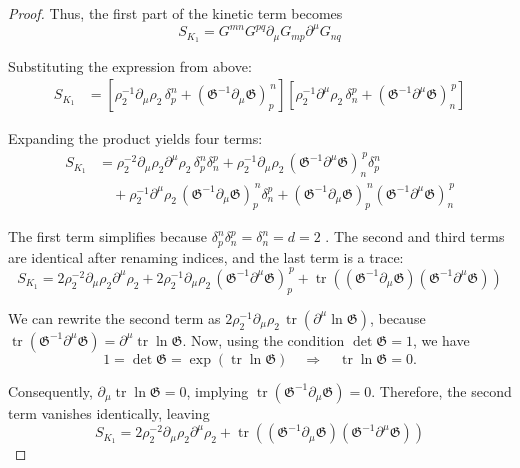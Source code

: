 \begin{tcolorbox}[breakable]
\begin{proof}
		Thus, the first part of the kinetic term becomes
		\begin{equation}
			S_{K_1} = G^{mn}G^{pq}\partial_\mu G_{mp}\partial^\mu G_{nq}
		\end{equation}
		
		Substituting the expression from above:
		\begin{align}
			S_{K_1} &= \left[ \rho_2^{-1}\partial_\mu \rho_2\,\delta_p^n + (\mathfrak{G}^{-1}\partial_\mu \mathfrak{G})_p^{\,n} \right] 
			\left[ \rho_2^{-1}\partial^\mu \rho_2\,\delta_n^p + (\mathfrak{G}^{-1}\partial^\mu \mathfrak{G})_n^{\,p} \right]
		\end{align}
		
		Expanding the product yields four terms:
		\begin{align}
			S_{K_1} &= \rho_2^{-2}\partial_\mu \rho_2\partial^\mu \rho_2\,\delta_p^n\delta_n^p  + \rho_2^{-1}\partial_\mu \rho_2\,(\mathfrak{G}^{-1}\partial^\mu \mathfrak{G})_n^{\,p}\delta_p^n \nonumber \\
			&\quad + \rho_2^{-1}\partial^\mu \rho_2\,(\mathfrak{G}^{-1}\partial_\mu \mathfrak{G})_p^{\,n}\delta_n^p + (\mathfrak{G}^{-1}\partial_\mu \mathfrak{G})_p^{\,n}(\mathfrak{G}^{-1}\partial^\mu \mathfrak{G})_n^{\,p}
		\end{align}
		
		The first term simplifies because \(\delta_p^n\delta_n^p = \delta_n^n = d=2\) . The second and third terms are identical after renaming indices, and the last term is a trace:
		\begin{equation}
			S_{K_1} = 2\rho_2^{-2}\partial_\mu \rho_2\partial^\mu \rho_2 
			+ 2\rho_2^{-1}\partial_\mu \rho_2\,(\mathfrak{G}^{-1}\partial^\mu \mathfrak{G})_p^{\,p}
			+ \operatorname{tr}\left((\mathfrak{G}^{-1}\partial_\mu \mathfrak{G})(\mathfrak{G}^{-1}\partial^\mu \mathfrak{G})\right)
		\end{equation}
		
		We can rewrite the second term as \(2\rho_2^{-1}\partial_\mu \rho_2 \,\operatorname{tr}(\partial^\mu \ln \mathfrak{G})\), because \(\operatorname{tr}(\mathfrak{G}^{-1}\partial^\mu \mathfrak{G}) = \partial^\mu \operatorname{tr}\ln \mathfrak{G}\). Now, using the condition \(\det \mathfrak{G} = 1\), we have
		\begin{equation}
			1 = \det \mathfrak{G} = \exp(\operatorname{tr}\ln \mathfrak{G}) \quad\Rightarrow\quad \operatorname{tr}\ln \mathfrak{G} = 0.
		\end{equation}
		
		Consequently, \(\partial_\mu \operatorname{tr}\ln \mathfrak{G} = 0\), implying \(\operatorname{tr}(\mathfrak{G}^{-1}\partial_\mu \mathfrak{G}) = 0\). Therefore, the second term vanishes identically, leaving
		\begin{equation}
			S_{K_1} = 2\rho_2^{-2}\partial_\mu \rho_2\partial^\mu \rho_2 
			+ \operatorname{tr}\left((\mathfrak{G}^{-1}\partial_\mu \mathfrak{G})(\mathfrak{G}^{-1}\partial^\mu \mathfrak{G})\right)
		\end{equation}
		

\end{proof}
\end{tcolorbox}
